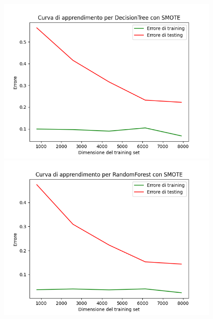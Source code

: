 \begin{figure}[H]
    \centering
    \begin{minipage}[b]{0.45\linewidth}
      \centering
      \includegraphics[scale=0.5]{img/learning_curve_DecisionTree_SMOTE.png}
      
    \end{minipage}
    \hfill
    \begin{minipage}[b]{0.45\linewidth}
      \centering
      \includegraphics[scale=0.5]{img/learning_curve_RandomForest_SMOTE.png}
      
    \end{minipage}
    

\end{figure}
